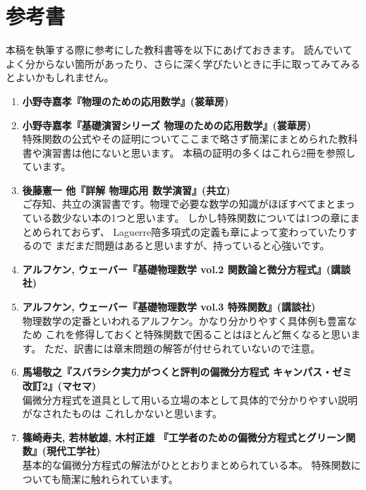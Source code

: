 \documentclass[../main/main]{subfiles}
\begin{document}
\section*{参考書}
本稿を執筆する際に参考にした教科書等を以下にあげておきます。
読んでいてよく分からない箇所があったり、さらに深く学びたいときに手に取ってみてみるとよいかもしれません。\vspace{6pt}
\begin{enumerate}
  \item \textbf{小野寺嘉孝『物理のための応用数学』(裳華房) }
  \item \textbf{小野寺嘉孝『基礎演習シリーズ 物理のための応用数学』(裳華房)} \\
  特殊関数の公式やその証明についてここまで略さず簡潔にまとめられた教科書や演習書は他にないと思います。
  本稿の証明の多くはこれら2冊を参照しています。\vspace{6pt}

  \item \textbf{後藤憲一 他『詳解 物理応用 数学演習』(共立)} \\
  ご存知、共立の演習書です。物理で必要な数学の知識がほぼすべてまとまっている数少ない本の1つと思います。
  しかし特殊関数については1つの章にまとめられておらず、
  Laguerre陪多項式の定義も章によって変わっていたりするので
  まだまだ問題はあると思いますが、持っていると心強いです。\vspace{6pt}

  \item \textbf{アルフケン, ウェーバー『基礎物理数学 vol.2 関数論と微分方程式』(講談社)}
  \item \textbf{アルフケン, ウェーバー『基礎物理数学 vol.3 特殊関数』(講談社)} \\
  物理数学の定番といわれるアルフケン。かなり分かりやすく具体例も豊富なため
  これを修得しておくと特殊関数で困ることはほとんど無くなると思います。
  ただ、訳書には章末問題の解答が付せられていないので注意。\vspace{6pt}

  \item \textbf{馬場敬之『スバラシク実力がつくと評判の偏微分方程式 キャンパス・ゼミ 改訂2』(マセマ)}\\
  偏微分方程式を道具として用いる立場の本として具体的で分かりやすい説明がなされたものは
  これしかないと思います。\vspace{6pt}

  \item \textbf{篠崎寿夫, 若林敏雄, 木村正雄 『工学者のための偏微分方程式とグリーン関数』(現代工学社)}\\
  基本的な偏微分方程式の解法がひととおりまとめられている本。
  特殊関数についても簡潔に触れられています。\vspace{6pt}


\end{enumerate}
\end{document}
